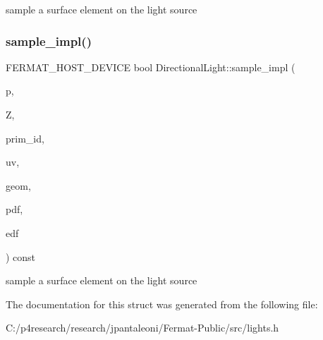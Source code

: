 sample a surface element on the light source \mbox{\label{struct_directional_light_a0f13eac548f1e19cb3098668ab2a8fcc}} 
\subsubsection{\texorpdfstring{sample\+\_\+impl()}{sample\_impl()}\hspace{0.1cm}{\footnotesize\ttfamily [2/2]}}
{\footnotesize\ttfamily F\+E\+R\+M\+A\+T\+\_\+\+H\+O\+S\+T\+\_\+\+D\+E\+V\+I\+CE bool Directional\+Light\+::sample\+\_\+impl (\begin{DoxyParamCaption}\item[{const \hyperlink{structcugar_1_1_vector}{cugar\+::\+Vector3f}}]{p,  }\item[{const float $\ast$}]{Z,  }\item[{uint32\+\_\+t $\ast$}]{prim\+\_\+id,  }\item[{\hyperlink{structcugar_1_1_vector}{cugar\+::\+Vector2f} $\ast$}]{uv,  }\item[{\hyperlink{struct_vertex_geometry}{Vertex\+Geometry} $\ast$}]{geom,  }\item[{float $\ast$}]{pdf,  }\item[{\hyperlink{struct_edf}{Edf} $\ast$}]{edf }\end{DoxyParamCaption}) const\hspace{0.3cm}{\ttfamily [inline]}}

sample a surface element on the light source 

The documentation for this struct was generated from the following file\+:\begin{DoxyCompactItemize}
\item 
C\+:/p4research/research/jpantaleoni/\+Fermat-\/\+Public/src/lights.\+h\end{DoxyCompactItemize}
